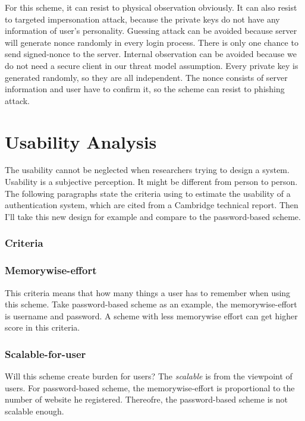 \begin{CJK}{Bg5}{bsmi}
For this scheme, it can resist to physical observation obviously. It can also resist to targeted impersonation attack, because the private keys do not have any information of user's personality. Guessing attack can be avoided because server will generate nonce randomly in every login process. There is only one chance to send signed-nonce to the server. Internal observation can be avoided because we do not need a secure client in our threat model assumption. Every private key is generated randomly, so they are all independent. The nonce consists of server information and user have to confirm it, so the scheme can resist to phishing attack.

\section{Usability Analysis}

The usability cannot be neglected when researchers trying to design a system. Usability is a subjective perception. It might be different from person to person.
The following paragraphs state the criteria using to estimate the usability of a authentication system, which are cited from a Cambridge technical report\cite{password-extended}. Then I'll take this new design for example and compare to the password-based scheme.

\subsubsection{Criteria}

\subsubsection{Memorywise-effort}

This criteria means that how many things a user has to remember when using this scheme. Take password-based scheme as an example, the memorywise-effort is username and password. A scheme with less memorywise effort can get higher score in this criteria.

\subsubsection{Scalable-for-user}

Will this scheme create burden for users? The \emph{scalable} is from the viewpoint of users. For password-based scheme, the memorywise-effort is proportional to the number of website he registered. Thereofre, the password-based scheme is not scalable enough.


\end{CJK}
